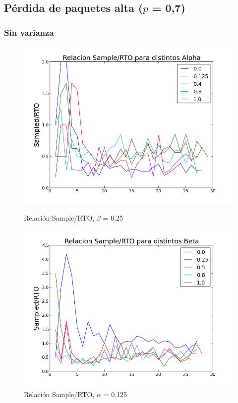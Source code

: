 \subsection{Pérdida de paquetes alta ($p$ = 0,7)}
\subsubsection{Sin varianza}

\begin{figure}[H]
\begin{minipage}{0.5\linewidth}
\includegraphics[width=\linewidth]{../graficos/alphavar0drop70.png}
\caption{Relación Sample/RTO, $\beta$ = 0.25}\label{fig:alpha-var0-drop70}
\end{minipage}
\hfill
\begin{minipage}{0.5\linewidth}
\includegraphics[width=\linewidth]{../graficos/betavar0drop70.png}
\caption{Relación Sample/RTO, $\alpha$ = 0.125}\label{fig:beta-var0-drop70}
\end{minipage}
\end{figure}

